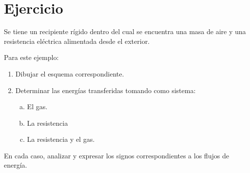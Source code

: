 \section{Ejercicio}\label{ej:Chap02Ejercicio02}
Se tiene un recipiente rígido dentro del cual se encuentra una masa de aire y una resistencia eléctrica alimentada desde el exterior.

Para este ejemplo:
\begin{enumerate}
    \item Dibujar el esquema correspondiente.
    \item Determinar las energías transferidas tomando como sistema:
    \begin{enumerate}[(a)]
        \item El gas.
        \item La resistencia
        \item La resistencia y el gas.
    \end{enumerate}
\end{enumerate}

En cada caso, analizar y expresar los signos correspondientes a los flujos de energía.